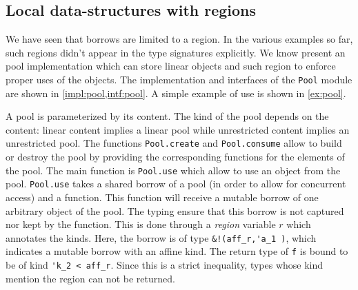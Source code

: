 


\subsection{Local data-structures with regions}
\label{tuto:pool}

We have seen that borrows are limited to a region. In the various examples so
far, such regions didn't appear in the type signatures explicitly.
We know present an pool implementation which can store linear objects
and such region to enforce proper uses of the objects.
The implementation and interfaces of the \texttt{Pool} module
are shown in \cref{impl:pool,intf:pool}. A simple example of use
is shown in \cref{ex:pool}. 

A pool is parameterized by its content. The kind of the pool
depends on the content: linear content implies
a linear pool while unrestricted content implies an unrestricted pool.
The functions \lstinline/Pool.create/ and \lstinline/Pool.consume/ allow
to build or destroy
the pool by providing the corresponding functions for the elements
of the pool.
The main function is \lstinline/Pool.use/ which
allow to use an object from the pool.
\lstinline/Pool.use/ takes a shared borrow of a pool (in order to allow
for concurrent access) and a function. This function will receive
a mutable borrow of one arbitrary object of the pool. The typing ensure
that this borrow is not captured nor kept by the function.
This is done through a \emph{region} variable $r$ which annotates
the kinds. Here, the borrow is of type \lstinline/&!(aff_r,'a_1 )/, which indicates
a mutable borrow with an affine kind. The return type of \lstinline/f/ is bound
to be of kind \lstinline/'k_2 < aff_r/. Since this is a strict inequality,
types whose kind mention the region can not be returned.

